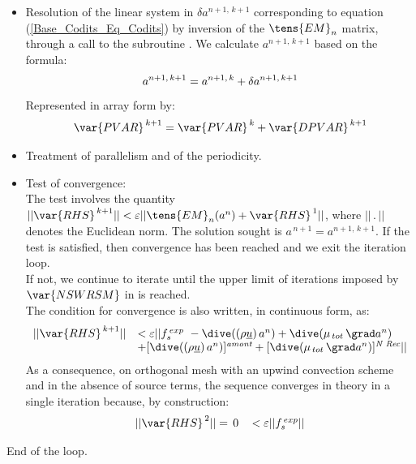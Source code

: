 \begin{itemize}
\item Resolution of the linear system in $\delta a^{n+1,\,k+1}$ corresponding
to equation (\ref{Base_Codits_Eq_Codits}) by inversion of the $\tens{EM}_{n}$ matrix, through a call to the subroutine .
We calculate $a^{n+1,\,k+1}$ based on the formula:
\begin{equation}\notag
a^{n+1,\,k+1} =  a^{n+1,\,k} + \delta a^{n+1,\,k+1}
\end{equation}
Represented in array form by:
\begin{equation}\notag
\var{PVAR}^{\,k+1} =  \var{PVAR}^{\,k} + \var{DPVAR}^{\,k+1}
\end{equation}

\item Treatment of parallelism and of the periodicity.
\item Test of convergence:\\
The test involves the quantity  $||\var{RHS}^{\,k+1}|| < \varepsilon
||\tens{EM}_{n}(a^{n}) + \var{RHS}^{\,1}|| $, where $||\,.\,||$ denotes the
Euclidean norm. The solution sought is  $a^{\,n+1} = a^{n+1,\,k+1}$. If the test is satisfied, then convergence has been reached and we exit the iteration loop. \\
If not, we continue to iterate until the upper limit of iterations imposed by $\var{NSWRSM}$ in  is reached.\\
The condition for convergence is also written, in continuous form, as:
\begin{equation}\notag
\begin{array}{ll}
||\var{RHS}^{\,k+1}||& < \varepsilon ||f_s^{\,exp}\ - \dive((\rho \underline{u})\,a^{n}) + \dive(\mu_{\,tot}\,\grad a^{n}) \\
& +[\dive((\rho \underline{u})\,a^{n})]^{\textit{amont}} + [\dive(\mu_{\,tot}\,\grad a^{n})]^{\textit{N Rec}}||\\
\end{array}
\end{equation}
As a consequence, on orthogonal mesh with an upwind convection scheme and in the absence of source terms, the sequence converges in theory in a single iteration because, by construction:
\begin{equation}\notag
\begin{array}{ll}
||\var{RHS}^{\,2}||=\,0\,& < \varepsilon ||f_s^{\,exp}||
\end{array}
\end{equation}
\end{itemize}
End of the loop.
\\

